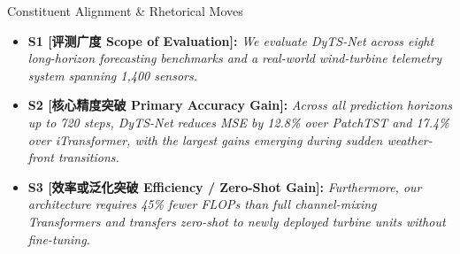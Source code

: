 \begin{TipBox}{Constituent Alignment \& Rhetorical Moves}
\begin{itemize}[leftmargin=1.5em]
  \item \textbf{S1 [评测广度 Scope of Evaluation]:} \textit{We evaluate DyTS-Net across eight long-horizon forecasting benchmarks and a real-world wind-turbine telemetry system spanning 1,400 sensors.}\par{}
  \item \textbf{S2 [核心精度突破 Primary Accuracy Gain]:} \textit{Across all prediction horizons up to 720 steps, DyTS-Net reduces MSE by 12.8\% over PatchTST and 17.4\% over iTransformer, with the largest gains emerging during sudden weather-front transitions.}\par{}
  \item \textbf{S3 [效率或泛化突破 Efficiency / Zero-Shot Gain]:} \textit{Furthermore, our architecture requires 45\% fewer FLOPs than full channel-mixing Transformers and transfers zero-shot to newly deployed turbine units without fine-tuning.}\par{}
\end{itemize}
\end{TipBox}
\bigskip
